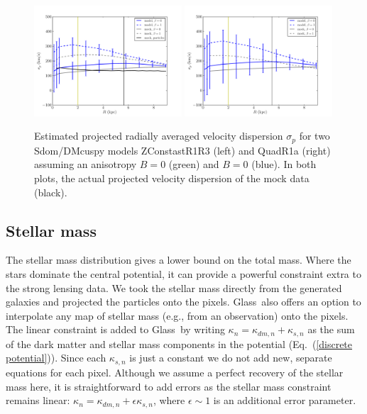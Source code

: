 \documentclass[galley,usenatbib]{mn2e}
\newcommand{\Glass}{{\sc Glass}}
\newcommand{\eqnref}[1] {Eq.~(\ref{#1})}
\begin{document}
\begin{figure}
\includegraphics[width=0.49\textwidth]{BCZContrastR1R3_TmS_sigp.pdf}
\includegraphics[width=0.49\textwidth]{BCQuadR1a_TmS_sigp.pdf}
\caption{Estimated projected radially averaged velocity dispersion $\sigma_p$ for two Sdom/DMcuspy models ZConstastR1R3
  (left) and QuadR1a (right) assuming an anisotropy $B=0$ (green) and $B=0$ (blue). In both plots, the actual projected
  velocity dispersion of the mock data (black).
  }
\label{fig:sigp}
\end{figure}

\subsection{Stellar mass}
\label{stellar mass}

The stellar mass distribution gives a lower bound on the total mass. Where the stars dominate the central potential, it can provide a powerful constraint extra to the strong lensing data. We took the stellar mass directly from
the generated galaxies and projected the particles onto the pixels. \Glass\
also offers an option to interpolate any map of stellar mass (e.g., from an
observation) onto the pixels. The linear constraint is added to \Glass\ by
writing $\kappa_n = \kappa_{dm,n} + \kappa_{s,n}$ as the sum of the
dark matter and stellar mass components in the potential (\eqnref{discrete
potential}). Since each $\kappa_{s,n}$ is just a constant we do not add new,
separate equations for each pixel. Although we assume a perfect recovery of the stellar mass here, it is straightforward to add errors as the stellar mass constraint remains linear: $\kappa_n = \kappa_{dm,n} + \epsilon \kappa_{s,n}$, where $\epsilon \sim 1$ is an additional error parameter. 
\end{document}
